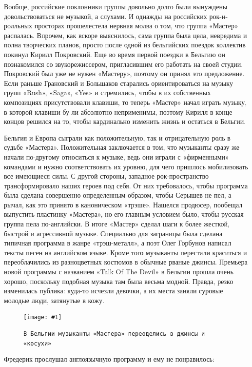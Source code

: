 \documentclass[16pt,a5paper]{book}
\newcommand{\myincludegraphics}[1]{\texttt{[image: \#1]}}
\begin{document}
Вообще, российские поклонники группы довольно долго были вынуждены довольствоваться не музыкой, а слухами. И однажды на
российских рок-н-ролльных просторах прошелестела нервная молва о том, что группа «Мастер» распалась. Впрочем, как вскоре
выяснилось, сама группа была цела, невредима и полна творческих планов, просто после одной из бельгийских поездок
коллектив покинул Кирилл Покровский. Еще во время первой поездки в Бельгию он познакомился со звукорежиссером,
пригласившим его работать на своей студии. Покровский был уже не нужен «Мастеру», поэтому он принял это предложение.
Если раньше Грановский и Большаков старались ориентироваться на музыку групп «Rush», «Saga», «Yes» и стремились, чтобы в
их собственных композициях присутствовали клавиши, то теперь «Мастер» начал играть музыку, в которой клавиши бу ли
абсолютно неприменимы, поэтому Кирилл в конце концов решился на то, чтобы кардинально изменить жизнь и остаться в
Бельгии.

Бельгия и Европа сыграли как положительную, так и отрицательную роль в судьбе «Мастера». Положительная заключается в
том, что музыканты сразу же начали по-другому относиться к музыке, ведь они играли с «фирменными» командами и нужно
соответствовать их уровню, для чего пришлось мобилизовать все имеющиеся силы. С другой стороны, западное
рок-пространство трансформировало наших героев под себя. От них требовалось, чтобы программа была сделана совершенно
определенным образом, чтобы Серышев не пел, а рычал, как это принято в каноническом «трэше». Нашелся продюсер, пообещал
выпустить пластинку «Мастера», но его главным условием было, чтобы русская группа пела по-английски. В итоге «Мастер»
сделал шаги к более жесткой, быстрой и агрессивной музыке. Специально для заграницы была сделана типичная программа в
жанре «трэш-металл», а поэт Олег Горбунов написал тексты песен на английском языке. Кроме того музыканты перестали
краситься и переоблачились из разноцветных костюмов в обычные рваные джинсы. Премьера новой программы с названием «Talk
Of The Devil» в Бельгии прошла очень хорошо, поскольку подобная музыка там была весьма модной. Правда, резко изменилась
публика: куда-то исчезли девочки, а их места заняли суровые молодые люди, затянутые в кожу.

\begin{figure}[h]
    \centering
    \myincludegraphics{Image26}
    \caption{\texttt{В Бельгии музыканты «Мастера» переоделись в джинсы и «косухи»}}
\end{figure}

Фредерик прослушал англоязычную программу и ему не понравилось:
\end{document}
